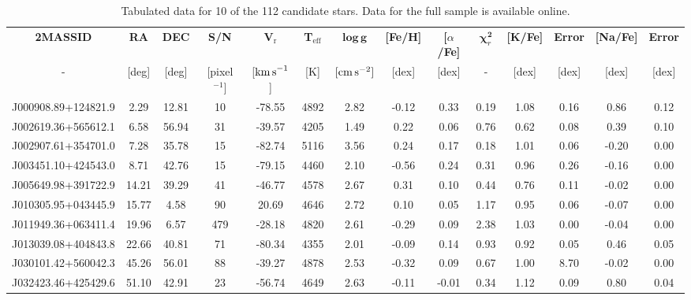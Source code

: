 \documentclass[a4paper,fleqn,usenatbib]{mnras}
\begin{document}
\label{sec:scenarios}
\begin{table}
\centering
\caption{Tabulated data for 10 of the 112 candidate stars. Data for the full sample is available online.}
\label{my-label}
\begin{tabular}{cccccccccccccc}
\hline
\textbf{2MASSID} & \textbf{RA} & \textbf{DEC} & \textbf{S/N} & \textbf{V$_\textrm{r}$} & \textbf{T$_\textrm{eff}$} & $\boldsymbol \log{ \, \textbf{g}}$ & \textbf{{[}Fe/H{]}} & \textbf{{[}$\alpha$/Fe{]}} & \textbf{$\boldsymbol \chi_r ^\textbf{2}$} & \textbf{{[}K/Fe{]}} & \textbf{Error} & \textbf{{[}Na/Fe{]}} & \textbf{Error} \\ 
- & {[}deg{]} & {[}deg{]} & [pixel$^{-1}]$ & {[${\rm km\,s}^{-1}$]} & {[}K{]} & $[{\rm cm\,s}^{-2}]$ & {[}dex{]} & {[}dex{]} & - & {[}dex{]} & {[}dex{]} & {[}dex{]} & {[}dex{]} \\ \hline
J000908.89+124821.9 & 2.29 & 12.81 & 10 & -78.55 & 4892 & 2.82 & -0.12 & 0.33 & 0.19 & 1.08 & 0.16 & 0.86 & 0.12 \\
J002619.36+565612.1 & 6.58 & 56.94 & 31 & -39.57 & 4205 & 1.49 & 0.22 & 0.06 & 0.76 & 0.62 & 0.08 & 0.39 & 0.10 \\
J002907.61+354701.0 & 7.28 & 35.78 & 15 & -82.74 & 5116 & 3.56 & 0.24 & 0.17 & 0.18 & 1.01 & 0.06 & -0.20 & 0.00 \\
J003451.10+424543.0 & 8.71 & 42.76 & 15 & -79.15 & 4460 & 2.10 & -0.56 & 0.24 & 0.31 & 0.96 & 0.26 & -0.16 & 0.00 \\
J005649.98+391722.9 & 14.21 & 39.29 & 41 & -46.77 & 4578 & 2.67 & 0.31 & 0.10 & 0.44 & 0.76 & 0.11 & -0.02 & 0.00 \\
J010305.95+043445.9 & 15.77 & 4.58 & 90 & 20.69 & 4646 & 2.72 & 0.10 & 0.05 & 1.17 & 0.95 & 0.06 & -0.07 & 0.00 \\
J011949.36+063411.4 & 19.96 & 6.57 & 479 & -28.18 & 4820 & 2.61 & -0.29 & 0.09 & 2.38 & 1.03 & 0.00 & -0.04 & 0.00 \\
J013039.08+404843.8 & 22.66 & 40.81 & 71 & -80.34 & 4355 & 2.01 & -0.09 & 0.14 & 0.93 & 0.92 & 0.05 & 0.46 & 0.05 \\
J030101.42+560042.3 & 45.26 & 56.01 & 88 & -39.27 & 4878 & 2.53 & -0.32 & 0.09 & 0.67 & 1.00 & 8.70 & -0.02 & 0.00 \\
J032423.46+425429.6 & 51.10 & 42.91 & 23 & -56.74 & 4649 & 2.63 & -0.11 & -0.01 & 0.34 & 1.12 & 0.09 & 0.80 & 0.04 \\ \hline
\end{tabular}
\end{table}
\end{document}
